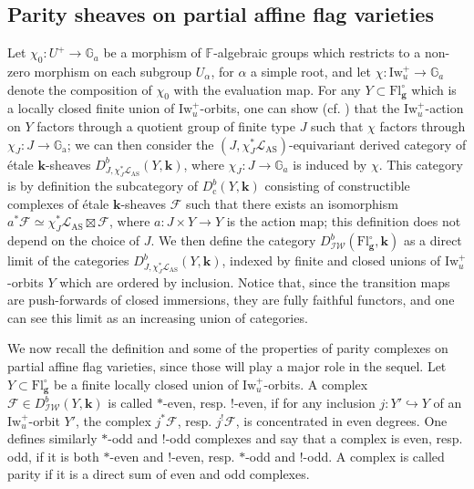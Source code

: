 \documentclass[11pt]{amsart}
\theoremstyle{plain}
\theoremstyle{remark}
\numberwithin{equation}{section}
\begin{document}
	\subsection{ Parity sheaves on partial affine flag varieties}\label{section partial affine flag}
	Let $\chi_0:U^+\to\mathbb{G}_a$ be a morphism of $\mathbb{F}$-algebraic groups which restricts to a non-zero morphism on each subgroup $U_\alpha$, for $\alpha$ a simple root, and let $\chi:\mathrm{Iw}_u^+\to \mathbb{G}_a$ denote the composition of $\chi_0$ with the evaluation map. For any $Y\subset \mathrm{Fl}^{\circ}_{\mathbf{g}}$ which is a locally closed finite union of $\mathrm{Iw}_u^+$-orbits, one can show (cf. \cite[Lemma 3.2]{ciappara2021hecke}) that the $\mathrm{Iw}_u^+$-action on $Y$ factors through a quotient group of finite type $J$ such that $\chi$ factors through $\chi_J:J\to \mathbb{G}_\mathrm{a}$; we can then consider the $(J,\chi_J^*\mathcal{L}_{\mathrm{AS}})$-equivariant derived category of \'etale $\mathbf{k}$-sheaves $D^b_{J,\chi_J^*\mathcal{L}_{\mathrm{AS}}}(Y,\mathbf{k})$, where $\chi_J:J\to \mathbb{G}_a$ is induced by $\chi$. This category is by definition the subcategory of $D_{\mathrm{c}}^b(Y,\mathbf{k})$ consisting of constructible complexes of \'etale $\mathbf{k}$-sheaves $\mathcal{F}$ such that there exists an isomorphism $a^*\mathcal{F}\simeq \chi_J^*\mathcal{L}_{\mathrm{AS}}\boxtimes\mathcal{F}$, where $a:J\times Y\to Y$ is the action map; this definition does not depend on the choice of $J$. We then define the category $D^b_{\mathcal{IW}}(\mathrm{Fl}^{\circ}_{\mathbf{g}},\mathbf{k})$ as a direct limit of the categories $D^b_{J,\chi_J^*\mathcal{L}_{\mathrm{AS}}}(Y,\mathbf{k})$, indexed by finite and closed unions of $\mathrm{Iw}_u^+$-orbits $Y$ which are ordered by inclusion. Notice that, since the transition maps are push-forwards of closed immersions, they are fully faithful functors, and one can see this limit as an increasing union of categories.
	
	We now  recall the definition and some of the properties of parity complexes on partial affine flag varieties, since those will play a major role in the sequel. Let $Y\subset \mathrm{Fl}^{\circ}_{\mathbf{g}}$ be a finite locally closed union of $\mathrm{Iw}_{u}^+$-orbits. A complex $\mathcal{F}\in D^b_{\mathcal{IW}}(Y,\mathbf{k})$ is called $*$-even, resp. $!$-even, if for any inclusion $j:Y'\hookrightarrow Y$ of an $\mathrm{Iw}_{u}^+$-orbit $Y'$, the complex $j^*\mathcal{F}$, resp. $j^!\mathcal{F}$, is concentrated in even degrees. One defines similarly $*$-odd and $!$-odd complexes and say that a complex is even, resp. odd, if it is both $*$-even and $!$-even, resp. $*$-odd and $!$-odd. A complex is called parity if it is a direct sum of even and odd complexes. 
	
\end{document}
